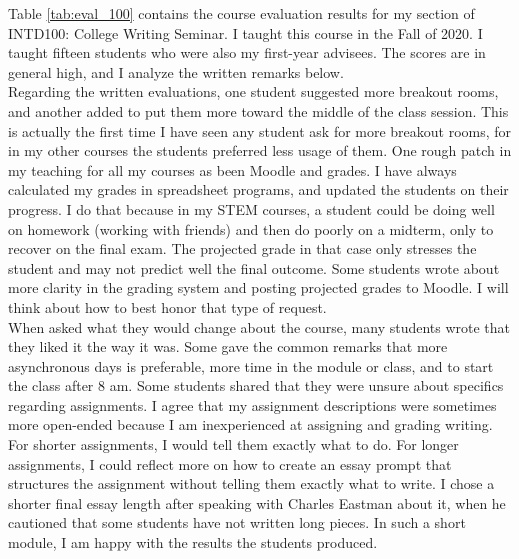 \documentclass[../../../main.tex]{subfiles}
\begin{document}
Table \ref{tab:eval_100} contains the course evaluation results for my section of INTD100: College Writing Seminar.  I taught this course in the Fall of 2020.  I taught fifteen students who were also my first-year advisees.  The scores are in general high, and I analyze the written remarks below.
\\
\vspace{0.25cm}
Regarding the written evaluations, one student suggested more breakout rooms, and another added to put them more toward the middle of the class session.  This is actually the first time I have seen any student ask for more breakout rooms, for in my other courses the students preferred less usage of them.  One rough patch in my teaching for all my courses as been Moodle and grades.  I have always calculated my grades in spreadsheet programs, and updated the students on their progress.  I do that because in my STEM courses, a student could be doing well on homework (working with friends) and then do poorly on a midterm, only to recover on the final exam.  The projected grade in that case only stresses the student and may not predict well the final outcome.  Some students wrote about more clarity in the grading system and posting projected grades to Moodle.  I will think about how to best honor that type of request.
\\
\vspace{0.25cm}
When asked what they would change about the course, many students wrote that they liked it the way it was.  Some gave the common remarks that more asynchronous days is preferable, more time in the module or class, and to start the class after 8 am.  Some students shared that they were unsure about specifics regarding assignments.  I agree that my assignment descriptions were sometimes more open-ended because I am inexperienced at assigning and grading writing.  For shorter assignments, I would tell them exactly what to do.  For longer assignments, I could reflect more on how to create an essay prompt that structures the assignment without telling them exactly what to write.  I chose a shorter final essay length after speaking with Charles Eastman about it, when he cautioned that some students have not written long pieces.  In such a short module, I am happy with the results the students produced.
\end{document}
